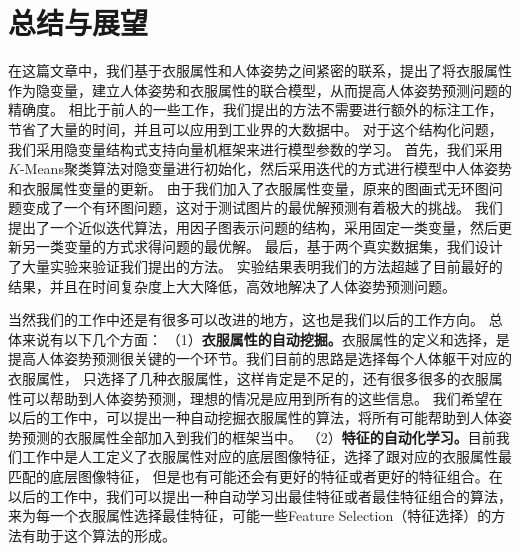 
\chapter{总结与展望}
在这篇文章中，我们基于衣服属性和人体姿势之间紧密的联系，提出了将衣服属性作为隐变量，建立人体姿势和衣服属性的联合模型，从而提高人体姿势预测问题的精确度。
相比于前人的一些工作，我们提出的方法不需要进行额外的标注工作，节省了大量的时间，并且可以应用到工业界的大数据中。
对于这个结构化问题，我们采用隐变量结构式支持向量机框架来进行模型参数的学习。
首先，我们采用$K$-Means聚类算法对隐变量进行初始化，然后采用迭代的方式进行模型中人体姿势和衣服属性变量的更新。
由于我们加入了衣服属性变量，原来的图画式无环图问题变成了一个有环图问题，这对于测试图片的最优解预测有着极大的挑战。
我们提出了一个近似迭代算法，用因子图表示问题的结构，采用固定一类变量，然后更新另一类变量的方式求得问题的最优解。
最后，基于两个真实数据集，我们设计了大量实验来验证我们提出的方法。
实验结果表明我们的方法超越了目前最好的结果，并且在时间复杂度上大大降低，高效地解决了人体姿势预测问题。

当然我们的工作中还是有很多可以改进的地方，这也是我们以后的工作方向。
总体来说有以下几个方面：
（1）\textbf{衣服属性的自动挖掘。}衣服属性的定义和选择，是提高人体姿势预测很关键的一个环节。我们目前的思路是选择每个人体躯干对应的衣服属性，
只选择了几种衣服属性，这样肯定是不足的，还有很多很多的衣服属性可以帮助到人体姿势预测，理想的情况是应用到所有的这些信息。
我们希望在以后的工作中，可以提出一种自动挖掘衣服属性的算法，将所有可能帮助到人体姿势预测的衣服属性全部加入到我们的框架当中。
（2）\textbf{特征的自动化学习。}目前我们工作中是人工定义了衣服属性对应的底层图像特征，选择了跟对应的衣服属性最匹配的底层图像特征，
但是也有可能还会有更好的特征或者更好的特征组合。在以后的工作中，我们可以提出一种自动学习出最佳特征或者最佳特征组合的算法，
来为每一个衣服属性选择最佳特征，可能一些Feature Selection（特征选择）的方法有助于这个算法的形成。


